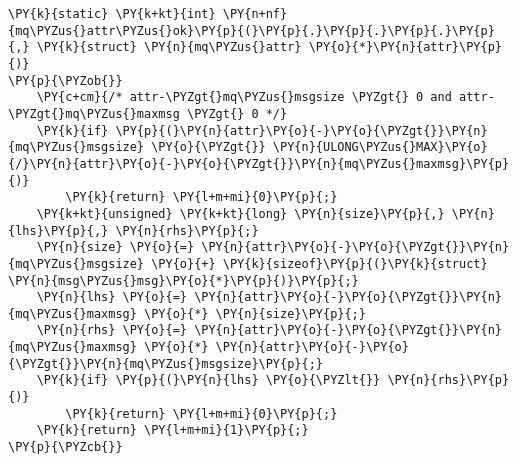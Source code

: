 \begin{Verbatim}[commandchars=\\\{\},codes={\catcode`\$=3\catcode`\^=7\catcode`\_=8}]
\PY{k}{static} \PY{k+kt}{int} \PY{n+nf}{mq\PYZus{}attr\PYZus{}ok}\PY{p}{(}\PY{p}{.}\PY{p}{.}\PY{p}{.}\PY{p}{,} \PY{k}{struct} \PY{n}{mq\PYZus{}attr} \PY{o}{*}\PY{n}{attr}\PY{p}{)}
\PY{p}{\PYZob{}}
    \PY{c+cm}{/* attr-\PYZgt{}mq\PYZus{}msgsize \PYZgt{} 0 and attr-\PYZgt{}mq\PYZus{}maxmsg \PYZgt{} 0 */}
    \PY{k}{if} \PY{p}{(}\PY{n}{attr}\PY{o}{-}\PY{o}{\PYZgt{}}\PY{n}{mq\PYZus{}msgsize} \PY{o}{\PYZgt{}} \PY{n}{ULONG\PYZus{}MAX}\PY{o}{/}\PY{n}{attr}\PY{o}{-}\PY{o}{\PYZgt{}}\PY{n}{mq\PYZus{}maxmsg}\PY{p}{)}
        \PY{k}{return} \PY{l+m+mi}{0}\PY{p}{;}
    \PY{k+kt}{unsigned} \PY{k+kt}{long} \PY{n}{size}\PY{p}{,} \PY{n}{lhs}\PY{p}{,} \PY{n}{rhs}\PY{p}{;}
    \PY{n}{size} \PY{o}{=} \PY{n}{attr}\PY{o}{-}\PY{o}{\PYZgt{}}\PY{n}{mq\PYZus{}msgsize} \PY{o}{+} \PY{k}{sizeof}\PY{p}{(}\PY{k}{struct} \PY{n}{msg\PYZus{}msg}\PY{o}{*}\PY{p}{)}\PY{p}{;}
    \PY{n}{lhs} \PY{o}{=} \PY{n}{attr}\PY{o}{-}\PY{o}{\PYZgt{}}\PY{n}{mq\PYZus{}maxmsg} \PY{o}{*} \PY{n}{size}\PY{p}{;}
    \PY{n}{rhs} \PY{o}{=} \PY{n}{attr}\PY{o}{-}\PY{o}{\PYZgt{}}\PY{n}{mq\PYZus{}maxmsg} \PY{o}{*} \PY{n}{attr}\PY{o}{-}\PY{o}{\PYZgt{}}\PY{n}{mq\PYZus{}msgsize}\PY{p}{;}
    \PY{k}{if} \PY{p}{(}\PY{n}{lhs} \PY{o}{\PYZlt{}} \PY{n}{rhs}\PY{p}{)}
        \PY{k}{return} \PY{l+m+mi}{0}\PY{p}{;}
    \PY{k}{return} \PY{l+m+mi}{1}\PY{p}{;}
\PY{p}{\PYZcb{}}
\end{Verbatim}
